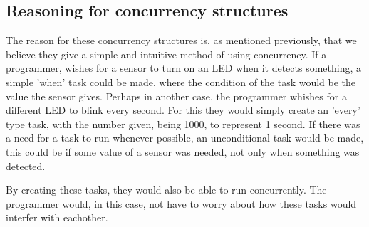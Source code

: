 \subsection{Reasoning for concurrency structures}
The reason for these concurrency structures is, as mentioned previously, that we believe they give a simple and intuitive method of using concurrency. If a programmer, wishes for a sensor to turn on an LED when it detects something, a simple 'when' task could be made, where the condition of the task would be the value the sensor gives. Perhaps in another case, the programmer whishes for a different LED to blink every second. For this they would simply create an 'every' type task, with the number given, being 1000, to represent 1 second. If there was a need for a task to run whenever possible, an unconditional task would be made, this could be if some value of a sensor was needed, not only when something was detected.

By creating these tasks, they would also be able to run concurrently. The programmer would, in this case, not have to worry about how these tasks would interfer with eachother.

